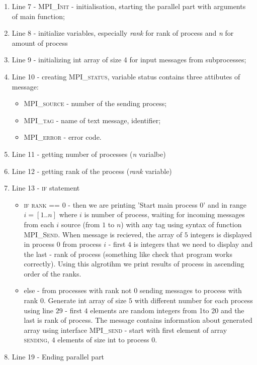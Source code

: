\documentclass[%
12pt, %
final, %
oneside, %
onecolumn, %
centertags]{article} %
\theoremstyle{plain}
\theoremstyle{definition}
\theoremstyle{remark}
\begin{document}
\begin{enumerate}
	\item Line 7 - \textsc{MPI\_Init} - initialisation, starting the parallel part with arguments of main function;
	\item Line 8 - initialize variables, especially \textit{rank} for rank of process and \textit{n} for amount of process
	\item Line 9 - initializing int array of size 4 for input messages from subprocesses;
	\item Line 10 - creating \textsc{MPI\_status}, variable status contains three attibutes of message:
	\begin{itemize}
		\item \textsc{MPI\_source} - number of the sending process;
		\item \textsc{MPI\_tag} - name of text message, identifier;
		\item \textsc{MPI\_error} - error code.
	\end{itemize}
	\item Line 11 - getting number of processes (\textit{n} varialbe)
	\item Line 12 - getting rank of the process (\textit{rank} variable)
	\item Line 13 - \textsc{if} statement
	\begin{itemize}
		\item \textsc{if rank == 0} - then we are printing 'Start main process 0' and in range $i=[1..n]$ where $i$ is number of process, waiting for incoming messages from each $i$ source (from $1$ to $n$) with any tag using syntax of function \textsc{MPI\_Send}. When message is recieved, the array of $5$ integers is displayed in process 0 from process $i$ - first $4$ is integers that we need to display and the last - rank of process (something like check that program works correctly). Using this algrotihm we print results of process in ascending order of the ranks.
		\item else - from processes with rank not $0$ sending messages to process with rank $0$. Generate int array of size $5$ with different number for each process using line $29$ - first $4$ elements are random integers from 1to 20 and the last is rank of process. The message contains information about generated array using interface \textsc{MPI\_send} - start with first element of array \textsc{sending}, $4$ elements of size int to process $0$.
	\end{itemize}
	\item Line 19 - Ending parallel part
\end{enumerate}
\end{document}
